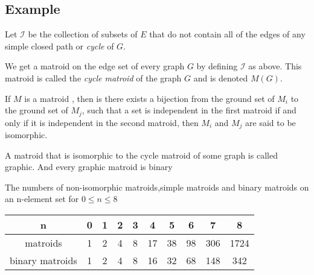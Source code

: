 \documentclass[../main.tex]{subfiles}
\begin{document}
\subsection{Example}
\begin{defn}
    Let $\mathcal{I}$ be the collection of subsets of $E$ that do not contain all of the edges of any simple closed path or \textit{cycle} of $G.$
\end{defn}

\begin{defn}
    We get a matroid on the edge set of every graph $G$ by defining $\mathcal{I}$ as above. This matroid is called the \textit{cycle matroid} of the graph $G$ and is denoted $M(G).$
\end{defn}

\begin{defn}
If $M$ is a matroid , then is there exists a bijection from the ground set of $M_i$ to the ground set of $M_j$, such that a set is independent in the first matroid if and only if it is independent in the second matroid, then $M_i$ and $M_j$ are said to be isomorphic. 
\end{defn}

\begin{note}
A matroid that is isomorphic to the cycle matroid of some graph is called graphic.
And every graphic matroid is binary
\end{note}

\noindent The numbers of non-isomorphic matroids,simple matroids and binary matroids on an n-element set for $0 \leq n \leq  8$
\begin{center}
 \begin{tabular}{| c c c c c c c c c c |} 
 \hline
 n & 0 & 1 & 2 & 3 & 4 & 5 & 6 & 7 & 8 \\ [0.5ex] 
 \hline\hline
 matroids & 1 & 2 & 4 & 8 & 17 & 38 & 98 & 306 & 1724\\ 
 \hline
 binary matroids & 1 & 2 & 4 & 8 & 16 & 32 & 68 & 148 & 342\\
 \hline
\end{tabular}
\end{center}
\end{document}
